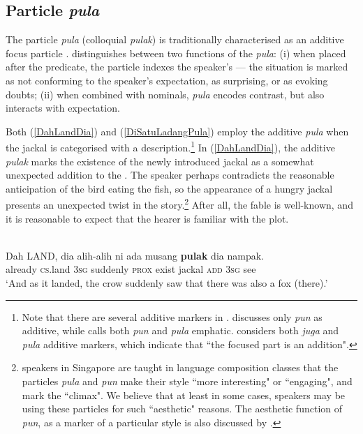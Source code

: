 \documentclass[output=paper
,modfonts
,nonflat]{langsci/langscibook}
\begin{document}
\subsection{Particle \emph{pula}}\label{GivenPula}
The  particle \emph{pula} (colloquial \emph{pulak}) is traditionally characterised as an additive focus particle \citep[236]{Sneddon2012}. \cite[pula(k)]{Nomoto2017} distinguishes between two  functions of the  \emph{pula}: (i) when placed after the predicate, the particle indexes the speaker's  --- the situation is marked as not conforming to the speaker's expectation, as surprising, or as evoking doubts; (ii) when combined with nominals, \emph{pula} encodes contrast, but also interacts with expectation. 

Both (\ref{DahLandDia}) and (\ref{DiSatuLadangPula}) employ the additive \emph{pula} when the jackal is categorised with a description.\footnote{Note that there are several additive markers in . \cite[91]{Forker2016} discusses only \emph{pun} as additive, while \cite[27]{Goddard2001} calls both \emph{pun} and \emph{pula} emphatic. \cite[236]{Sneddon2012} considers both \emph{juga} and \emph{pula} additive markers, which indicate that ``the focused part is an addition".} In (\ref{DahLandDia}), the additive \emph{pulak} marks the existence of the newly introduced jackal as a somewhat unexpected addition to the . The speaker perhaps contradicts the reasonable anticipation of the bird eating the fish, so the appearance of a hungry jackal presents an unexpected twist in the story.\footnote{ speakers in Singapore are taught in  language composition classes that the particles \emph{pula} and \emph{pun} make their style ``more interesting" or ``engaging", and mark the ``climax". We believe that at least in some cases,  speakers may be using these particles for such ``aesthetic" reasons. The aesthetic function of \emph{pun}, as a marker of a particular style is also discussed by \cite[107]{Cumming1991}.}  After all, the fable is well-known, and it is reasonable to expect that the hearer is familiar with the plot. 

\ea\label{DahLandDia} 
\\
\gll 	Dah     LAND,   dia alih-alih ni   ada    {\ob}musang{\cb} \textbf{pulak} dia nampak.\\
	already \textsc{cs}.land \textsc{3sg} suddenly  \textsc{prox} exist jackal    \textsc{add}  \textsc{3sg} see\\
\glt `And as it landed, the crow suddenly saw that there was also a fox (there).'
\z
\end{document}
